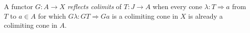 A functor $G : A \to X$ \emph{reflects colimits} of $T : J \to A$ when every cone $\lambda : T \mathbin{\Rightarrow} a$ from $T$ to $a \in A$ for which $G \lambda : G T \mathbin{\Rightarrow} G a$ is a colimiting cone in $X$ is already a colimiting cone in $A$.
